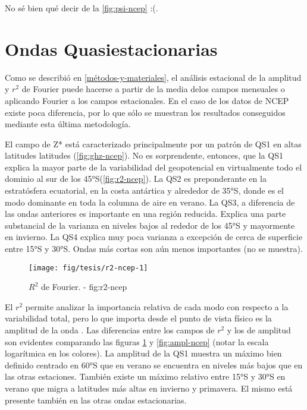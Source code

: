 \documentclass[spanish,a4paper]{book}
\begin{document}
No sé bien qué decir de la \autoref{fig:psi-ncep} :(.

\section{Ondas Quasiestacionarias}\label{ondas-quasiestacionarias}

Como se describió en \autoref{métodos-y-materiales}, el análisis
estacional de la amplitud y \(r^2\) de Fourier puede hacerse a partir de
la media delos campos mensuales o aplicando Fourier a los campos
estacionales. En el caso de los datos de NCEP existe poca diferencia,
por lo que sólo se muestran los resultados conseguidos mediante esta
última metodología.

El campo de Z* está caracterizado principalmente por un patrón de QS1 en
altas latitudes latitudes (\autoref{fig:ghz-ncep}). No es sorprendente,
entonces, que la QS1 explica la mayor parte de la variabilidad del
geopotencial en virtualmente todo el dominio al sur de los
45°S(\autoref{fig:r2-ncep}). La QS2 es preponderante en la estratósfera
ecuatorial, en la costa antártica y alrededor de 35°S, donde es el modo
dominante en toda la columna de aire en verano. La QS3, a diferencia de
las ondas anteriores es importante en una región reducida. Explica una
parte substancial de la varianza en niveles bajos al rededor de los 45°S
y mayormente en invierno. La QS4 explica muy poca varianza a excepción
de cerca de superficie entre 15°S y 30°S. Ondas más cortas son aún menos
importantes (no se muestra).

\begin{figure}

{\centering \texttt{[image: fig/tesis/r2-ncep-1]} 

}

\caption{$R^2$ de Fourier. - fig:r2-ncep}\label{fig:r2-ncep}
\end{figure}

El \(r^2\) permite analizar la importancia relativa de cada modo con
respecto a la variabilidad total, pero lo que importa desde el punto de
vista físico es la amplitud de la onda
. Las diferencias entre
los campos de \(r^2\) y los de amplitud son evidentes comparando las
figuras \ref{fig:r2-ncep} y \ref{fig:ampl-ncep} (notar la escala
logarítmica en los colores). La amplitud de la QS1 muestra un máximo
bien definido centrado en 60°S que en verano se encuentra en niveles más
bajos que en las otras estaciones. También existe un máximo relativo
entre 15°S y 30°S en verano que migra a latitudes más altas en invierno
y primavera. El mismo está presente también en las otras ondas
estacionarias.
\end{document}
